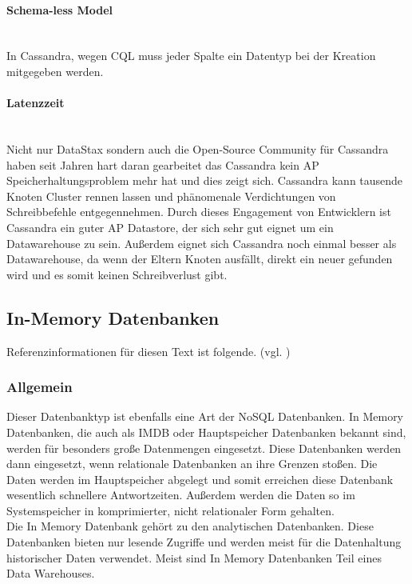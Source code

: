 \paragraph{Schema-less Model}\mbox{} \\
In Cassandra, wegen CQL muss jeder Spalte ein Datentyp bei der Kreation mitgegeben werden.
\paragraph{Latenzzeit}\mbox{} \\
Nicht nur DataStax sondern auch die Open-Source Community für Cassandra haben seit Jahren hart daran gearbeitet das Cassandra kein AP Speicherhaltungsproblem mehr hat und dies zeigt sich. Cassandra kann tausende Knoten Cluster rennen lassen und phänomenale Verdichtungen von Schreibbefehle entgegennehmen. Durch dieses Engagement von Entwicklern ist Cassandra ein guter AP Datastore, der sich sehr gut eignet um ein Datawarehouse zu sein. Außerdem eignet sich Cassandra noch einmal besser als Datawarehouse, da wenn der Eltern Knoten ausfällt, direkt ein neuer gefunden wird und es somit keinen Schreibverlust gibt.

\subsection{In-Memory Datenbanken}
Referenzinformationen für diesen Text ist folgende. (vgl. \cite{datenbanken_-memory-datenbank_2020})
\subsubsection{Allgemein}
Dieser Datenbanktyp ist ebenfalls eine Art der NoSQL Datenbanken. In Memory Datenbanken, die auch als IMDB oder Hauptspeicher Datenbanken bekannt sind, werden für besonders große Datenmengen eingesetzt. Diese Datenbanken werden dann eingesetzt, wenn relationale Datenbanken an ihre Grenzen stoßen. Die Daten werden im Hauptspeicher abgelegt und somit erreichen diese Datenbank wesentlich schnellere Antwortzeiten. Außerdem werden die Daten so im Systemspeicher in komprimierter, nicht relationaler Form gehalten.\\

Die In Memory Datenbank gehört zu den analytischen Datenbanken. Diese Datenbanken bieten nur lesende Zugriffe und werden meist für die Datenhaltung historischer Daten verwendet. Meist sind In Memory Datenbanken Teil eines Data Warehouses.
\newpage
